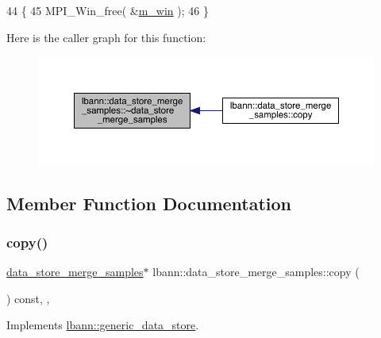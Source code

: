 \begin{DoxyCode}
44                                                     \{
45   MPI\_Win\_free( &\hyperlink{classlbann_1_1data__store__merge__samples_a8dafb907c605bb38e89ed3d91823f6f3}{m\_win} );
46 \}
\end{DoxyCode}
Here is the caller graph for this function\+:\nopagebreak
\begin{figure}[H]
\begin{center}
\leavevmode
\includegraphics[width=350pt]{classlbann_1_1data__store__merge__samples_a29eb31269a1369f6f28439e90ed8ad49_icgraph}
\end{center}
\end{figure}


\subsection{Member Function Documentation}
\mbox{\label{classlbann_1_1data__store__merge__samples_a37fc606c2347c6c6a24b588665e3cde5}} 
\subsubsection{\texorpdfstring{copy()}{copy()}}
{\footnotesize\ttfamily \hyperlink{classlbann_1_1data__store__merge__samples}{data\+\_\+store\+\_\+merge\+\_\+samples}$\ast$ lbann\+::data\+\_\+store\+\_\+merge\+\_\+samples\+::copy (\begin{DoxyParamCaption}{ }\end{DoxyParamCaption}) const\hspace{0.3cm}{\ttfamily [inline]}, {\ttfamily [override]}, {\ttfamily [virtual]}}



Implements \hyperlink{classlbann_1_1generic__data__store_ae06e089790aa023b839be508a3c020c6}{lbann\+::generic\+\_\+data\+\_\+store}.



